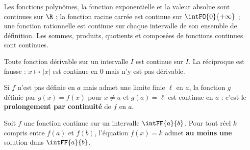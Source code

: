 \begin{propriete}
Les fonctions polynômes, la fonction exponentielle et la valeur absolue sont continues sur $\R$ ; la fonction racine carrée
est continue sur $\intFO{0}{+\infty}$ ; une fonction rationnelle est continue sur chaque intervalle de son ensemble de
définition. Les sommes, produits, quotients et composées de fonctions continues sont continues.
\end{propriete}

\begin{theoreme}
Toute fonction dérivable sur un intervalle $I$ est continue sur $I$. La réciproque est fausse : $x\mapsto|x|$ est
continue en $0$ mais n'y est pas dérivable.
\end{theoreme}

\begin{savoirfaire}
Si $f$ n'est pas définie en $a$ mais admet une limite finie $\ell$ en $a$, la fonction $g$ définie par $g(x)=f(x)$ pour
$x\neq a$ et $g(a)=\ell$ est continue en $a$ : c'est le \textbf{prolongement par continuité} de $f$ en $a$.
\end{savoirfaire}


\begin{theoreme}
Soit $f$ une fonction continue sur un intervalle $\intFF{a}{b}$. Pour tout réel $k$ compris entre $f(a)$ et $f(b)$,
l'équation $f(x)=k$ admet \textbf{au moins une} solution dans $\intFF{a}{b}$.
\end{theoreme}

